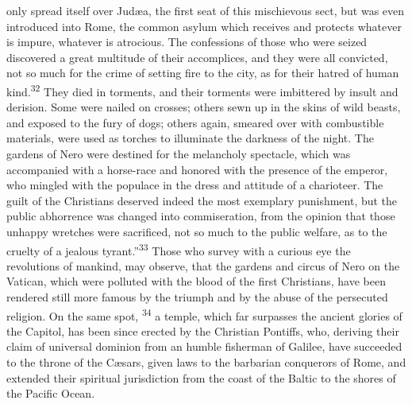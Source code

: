 only spread itself over Judæa, the first seat of this mischievous
sect, but was even introduced into Rome, the common asylum which
receives and protects whatever is impure, whatever is atrocious.
The confessions of those who were seized discovered a great
multitude of their accomplices, and they were all convicted, not
so much for the crime of setting fire to the city, as for their
hatred of human kind.\textsuperscript{32} They died in torments, and their
torments were imbittered by insult and derision. Some were nailed
on crosses; others sewn up in the skins of wild beasts, and
exposed to the fury of dogs; others again, smeared over with
combustible materials, were used as torches to illuminate the
darkness of the night. The gardens of Nero were destined for the
melancholy spectacle, which was accompanied with a horse-race and
honored with the presence of the emperor, who mingled with the
populace in the dress and attitude of a charioteer. The guilt of
the Christians deserved indeed the most exemplary punishment, but
the public abhorrence was changed into commiseration, from the
opinion that those unhappy wretches were sacrificed, not so much
to the public welfare, as to the cruelty of a jealous tyrant.”\textsuperscript{33}
Those who survey with a curious eye the revolutions of mankind,
may observe, that the gardens and circus of Nero on the Vatican,
which were polluted with the blood of the first Christians, have
been rendered still more famous by the triumph and by the abuse
of the persecuted religion. On the same spot, \textsuperscript{34} a temple, which
far surpasses the ancient glories of the Capitol, has been since
erected by the Christian Pontiffs, who, deriving their claim of
universal dominion from an humble fisherman of Galilee, have
succeeded to the throne of the Cæsars, given laws to the
barbarian conquerors of Rome, and extended their spiritual
jurisdiction from the coast of the Baltic to the shores of the
Pacific Ocean.




